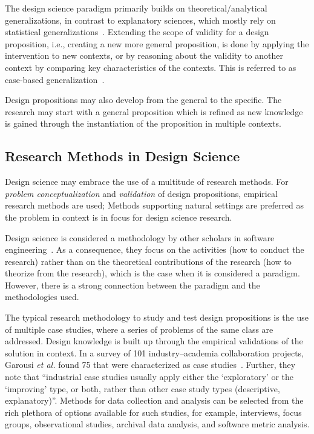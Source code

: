 \documentclass[graybox]{svmult}
\newcommand{\peggy}[1]{\textcolor{blue}{{\it [Peggy says: #1]}}}
\newcommand{\peggy}[1]{}
\begin{document}
The design science paradigm primarily builds on theoretical/analytical generalizations, in contrast to explanatory sciences, which mostly rely on statistical generalizations~\cite[p. 30]{Runeson12Case}. Extending the scope of validity for a design proposition, i.e., creating a new more general proposition, is done by applying the intervention to new contexts, or by reasoning about the validity to another context by comparing key characteristics of the contexts. This is referred to as case-based generalization~\cite{wieringa_six_2015}.  

Design propositions may also develop from the general to the specific. The research may start with a general proposition which is refined as new knowledge is gained through the instantiation of the proposition in multiple contexts. 


\subsection{Research Methods in Design Science} 
Design science may embrace the use of a multitude of research methods. For \emph{problem conceptualization} and \emph{validation} of design propositions, empirical research methods are used; Methods supporting natural settings are preferred as the problem in context is in focus for design science research. 

Design science is considered a methodology by other scholars in software engineering~\cite{Wohlin2015}. As a consequence, they focus on the %
activities (how to conduct the research) rather than on the theoretical contributions of the research (how to theorize from the research), which is the case when it is considered a paradigm. However, %
there is a strong connection between the paradigm and the methodologies used.%


The typical research methodology to study and test design propositions is the use of multiple case studies, where a series of problems of the same class are addressed. Design knowledge is built up through the empirical validations of the solution in context. 
In a survey of 101 industry--academia collaboration projects, Garousi \emph{et al.} found 75 that were characterized as case studies~\cite{Garousi2019}. Further, they note that ``industrial case studies usually apply either the `exploratory' or the `improving' type, or both, rather than other case study types (descriptive, explanatory)''. Methods for data collection and analysis can be selected from the rich plethora of options available for such studies, for example, interviews, focus groups, observational studies, archival data analysis, and software metric analysis. 
\end{document}
